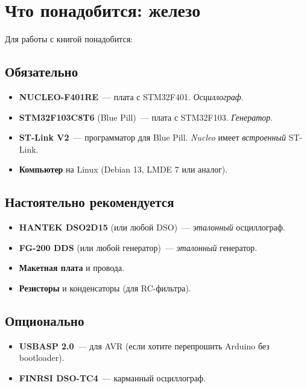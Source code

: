 \section{Что понадобится: железо}
\label{sec:intro-hardware}

Для работы с книгой понадобится:

\subsection{Обязательно}

\begin{itemize}
    \item \textbf{NUCLEO-F401RE}~--- плата с STM32F401.
          \emph{Осциллограф}.
    \item \textbf{STM32F103C8T6} (Blue Pill)~--- плата
          с STM32F103. \emph{Генератор}.
    \item \textbf{ST-Link V2}~--- программатор для Blue Pill.
          \emph{Nucleo} имеет \emph{встроенный} ST-Link.
    \item \textbf{Компьютер} на Linux (Debian 13, LMDE 7
          или аналог).
\end{itemize}

\subsection{Настоятельно рекомендуется}

\begin{itemize}
    \item \textbf{HANTEK DSO2D15} (или любой DSO)~---
          \emph{эталонный} осциллограф.
    \item \textbf{FG-200 DDS} (или любой генератор)~---
          \emph{эталонный} генератор.
    \item \textbf{Макетная плата} и провода.
    \item \textbf{Резисторы} и конденсаторы (для RC-фильтра).
\end{itemize}

\subsection{Опционально}

\begin{itemize}
    \item \textbf{USBASP 2.0}~--- для AVR (если хотите
          перепрошить Arduino без bootloader).
    \item \textbf{FINRSI DSO-TC4}~--- карманный осциллограф.
\end{itemize}

